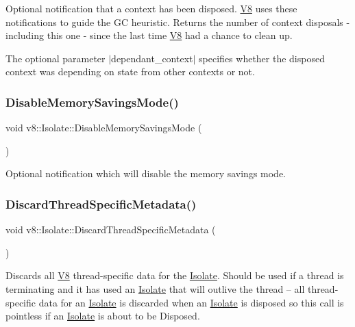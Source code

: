 Optional notification that a context has been disposed. \mbox{\hyperlink{classv8_1_1V8}{V8}} uses these notifications to guide the GC heuristic. Returns the number of context disposals -\/ including this one -\/ since the last time \mbox{\hyperlink{classv8_1_1V8}{V8}} had a chance to clean up.

The optional parameter $\vert$dependant\+\_\+context$\vert$ specifies whether the disposed context was depending on state from other contexts or not. \mbox{\label{classv8_1_1Isolate_ada6de60e0f53ff0d71330c5bf5f2daaa}} 
\subsubsection{\texorpdfstring{Disable\+Memory\+Savings\+Mode()}{DisableMemorySavingsMode()}}
{\footnotesize\ttfamily void v8\+::\+Isolate\+::\+Disable\+Memory\+Savings\+Mode (\begin{DoxyParamCaption}{ }\end{DoxyParamCaption})}

Optional notification which will disable the memory savings mode. \mbox{\label{classv8_1_1Isolate_ac62ff53be40f5ecd74fc9e72451da115}} 
\subsubsection{\texorpdfstring{Discard\+Thread\+Specific\+Metadata()}{DiscardThreadSpecificMetadata()}}
{\footnotesize\ttfamily void v8\+::\+Isolate\+::\+Discard\+Thread\+Specific\+Metadata (\begin{DoxyParamCaption}{ }\end{DoxyParamCaption})}

Discards all \mbox{\hyperlink{classv8_1_1V8}{V8}} thread-\/specific data for the \mbox{\hyperlink{classv8_1_1Isolate}{Isolate}}. Should be used if a thread is terminating and it has used an \mbox{\hyperlink{classv8_1_1Isolate}{Isolate}} that will outlive the thread -- all thread-\/specific data for an \mbox{\hyperlink{classv8_1_1Isolate}{Isolate}} is discarded when an \mbox{\hyperlink{classv8_1_1Isolate}{Isolate}} is disposed so this call is pointless if an \mbox{\hyperlink{classv8_1_1Isolate}{Isolate}} is about to be Disposed. \mbox{\label{classv8_1_1Isolate_a1a5a5762e4221aff8c6b10f9e3cec0af}} 
